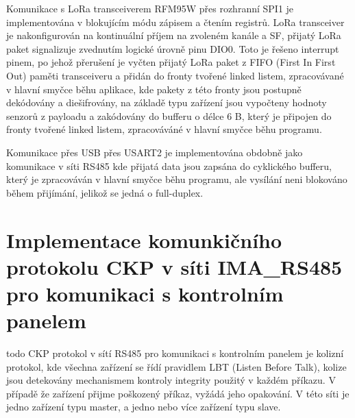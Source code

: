 Komunikace s LoRa transceiverem RFM95W přes rozhranní SPI1 je implementována v blokujícím módu zápisem a čtením registrů. 
LoRa transceiver je nakonfigurován na kontinuální příjem na zvoleném kanále a SF, přijatý LoRa paket signalizuje zvednutím logické úrovně pinu DIO0. Toto je řešeno interrupt pinem, po jehož přerušení je vyčten přijatý LoRa paket z FIFO (First In First Out) paměti transceiveru a přidán do fronty tvořené linked listem, zpracovávané v hlavní smyčce běhu aplikace, kde pakety z této fronty jsou postupně dekódovány a diešifrovány, na základě typu zařízení jsou vypočteny hodnoty senzorů z payloadu a zakódovány do bufferu o délce 6 B, který je připojen do fronty tvořené linked listem, zpracováváné v hlavní smyčce běhu programu.

Komunikace přes USB přes USART2 je implementována obdobně jako komunikace v síti RS485 kde přijatá data jsou zapsána do cyklického bufferu, který je zpracováván v hlavní smyčce běhu programu, ale vysílání neni blokováno během přijímání, jelikož se jedná o full-duplex.



\section{Implementace komunkičního protokolu CKP v síti IMA\_RS485 pro komunikaci s kontrolním panelem}
todo
CKP protokol v sítí RS485 pro komunikaci s kontrolním panelem je kolizní protokol, kde všechna zařízení se řídí pravidlem LBT (Listen Before Talk), kolize jsou detekovány mechanismem kontroly integrity použitý v každém příkazu. V případě že zařízení přijme poškozený příkaz, vyžádá jeho opakování. V této síti je jedno zařízení typu master, a jedno nebo více zařízení typu slave.




